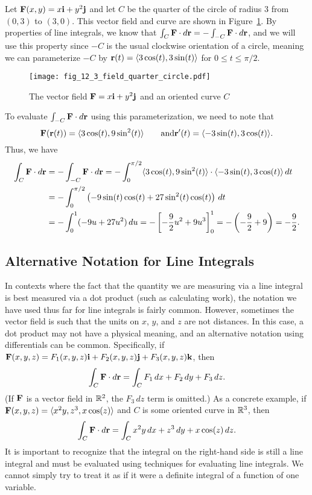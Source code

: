\begin{example}
  Let $\mathbf{F}(x,y) = x\mathbf{i} + y^2\mathbf{j}$ and let $C$ be the quarter of the circle of
  radius $3$ from $(0,3)$ to $(3,0)$. This vector field and curve are
  shown in Figure~\ref{F:12.3.field-quarter-circle}. By properties of line integrals,
  we know that $\int_C \mathbf{F}\cdot d\mathbf{r} = -\int_{-C}\mathbf{F}\cdot d\mathbf{r}$, and
  we will use this property since $-C$ is the usual clockwise
  orientation of a circle, meaning we can parameterize $-C$ by $\mathbf{r}(t)
  = \langle 3\cos(t),3\sin(t)\rangle$ for $0\leq t\leq \pi/2$.
  \begin{figure}
    \centering
    \texttt{[image: fig\_12\_3\_field\_quarter\_circle.pdf]}
    \caption{The vector field $\mathbf{F} = x\mathbf{i} + y^2\mathbf{j}$ and an oriented
      curve $C$}
    \label{F:12.3.field-quarter-circle}
  \end{figure}

  To evaluate $\int_{-C}\mathbf{F}\cdot d\mathbf{r}$ using this parameterization, we
  need to note that
  \[\mathbf{F}(\mathbf{r}(t)) = \langle 3\cos(t) , 9\sin^2(t)\rangle\qquad\text{and}
  \mathbf{r}'(t) = \langle -3\sin(t),3\cos(t)\rangle.\]
  Thus, we have
  \begin{align*}\int_C\mathbf{F}\cdot d\mathbf{r} &= -\int_{-C}\mathbf{F}\cdot d\mathbf{r} = -\int_0^{\pi/2}
  \langle 3\cos(t),9\sin^2(t)\rangle\cdot\langle
  -3\sin(t),3\cos(t)\rangle\, dt\\
    &= -\int_0^{\pi/2} \left(-9\sin(t)\cos(t) +
      27\sin^2(t)\cos(t)\right)\, dt\\
    & = -\int_0^1 (-9 u + 27u^2)\, du = -\left[ -\frac{9}{2}u^2 +
      9u^3\right]_0^1 = -\left(-\frac{9}{2} + 9\right) = -\frac{9}{2}.
\end{align*}
\end{example}





\subsection*{Alternative Notation for Line Integrals}

In contexts where the fact that the quantity we are measuring via a
line integral is best measured via a dot product (such as calculating
work), the notation we have used thus far for line integrals is fairly
common. However, sometimes the vector field is such that the units on
$x$, $y$, and $z$ are not distances. In this case, a dot product may
not have a physical meaning, and an alternative notation using
differentials can be common. Specifically, if $\mathbf{F}(x,y,z) =
F_1(x,y,z)\mathbf{i} + F_2(x,y,z)\mathbf{j} + F_3(x,y,z)\mathbf{k}$, then
\[\int_C\mathbf{F}\cdot d\mathbf{r} = \int_C F_1\, dx + F_2\, dy + F_3\, dz.\]
(If $\mathbf{F}$ is a vector field in $\mathbb{R}^2$, the $F_3\, dz$ term is
omitted.) As a concrete example, if $\mathbf{F}(x,y,z) = \langle
x^2y,z^3,x\cos(z)\rangle$ and $C$ is some oriented curve in $\mathbb{R}^3$,
then
\[\int_C\mathbf{F}\cdot d\mathbf{r} = \int_C x^2y\, dx + z^3\, dy + x\cos(z)\, dz.\]
It is important to recognize that the integral on the right-hand side
is still a line integral and must be evaluated using techniques for
evaluating line integrals. We cannot simply try to treat it as if it
were a definite integral of a function of one variable.

